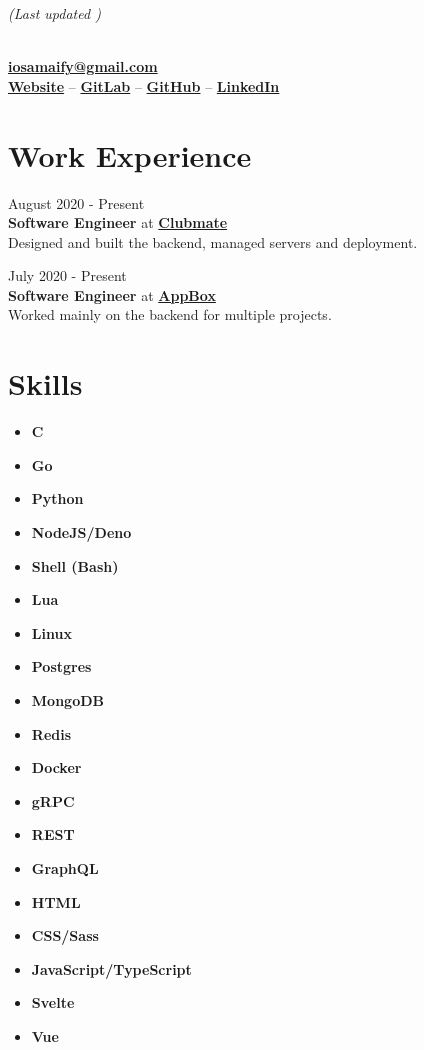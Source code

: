 \documentclass[letterpaper, 10pt]{article}
\author{Osama Muhammad}
\date{\today}
\makeatletter
\renewcommand{\maketitle}{
	\hfill{\small\textit{(Last updated \thedate)}}
	\vspace{1em}
	\begin{center}
		\par{\huge\bfseries{\theauthor}}
		\vspace{0.7em}\\
		\href{mailto:iosamaify@gmail.com}{\textbf{iosamaify@gmail.com}}
		\vspace{0.7em}\\
		\href{https://osamaragab.gitlab.io}{\textbf{Website}} --
		\href{https://gitlab.com/osamaragab}{\textbf{GitLab}} --
		\href{https://github.com/osamai}{\textbf{GitHub}} --
		\href{https://www.linkedin.com/in/osamamragab}{\textbf{LinkedIn}}
	\end{center}
}
\newcommand{\hr}{\par{\vspace{-.3\ht\strutbox}\noindent\hrulefill\par}}
\makeatother
\begin{document}
\maketitle

\hr

\section{Work Experience}

\hfill{\footnotesize{August 2020 - Present}}\\
\textbf{Software Engineer} at \href{https://www.clubmate-sports.co.uk}{\textbf{Clubmate}}\\
\vspace{1em}
Designed and built the backend, managed servers and deployment.
\vspace{0.3cm}

\hfill{\footnotesize{July 2020 - Present}}\\
\textbf{Software Engineer} at \href{https://www.app-box.co.uk}{\textbf{AppBox}}\\
\vspace{1em}
Worked mainly on the backend for multiple projects.
\vspace{0.3cm}

\vspace{0.3cm}
\hr

\section{Skills}

\begin{multicols}{3}
	\begin{itemize}
		\item \textbf{C}
		\item \textbf{Go}
		\item \textbf{Python}
		\item \textbf{NodeJS/Deno}
		\item \textbf{Shell (Bash)}
		\item \textbf{Lua}
		\item \textbf{Linux}
		\item \textbf{Postgres}
		\item \textbf{MongoDB}
		\item \textbf{Redis}
		\item \textbf{Docker}
		\item \textbf{gRPC}
		\item \textbf{REST}
		\item \textbf{GraphQL}
		\item \textbf{HTML}
		\item \textbf{CSS/Sass}
		\item \textbf{JavaScript/TypeScript}
		\item \textbf{Svelte}
		\item \textbf{Vue}
	\end{itemize}
\end{multicols}
\end{document}
